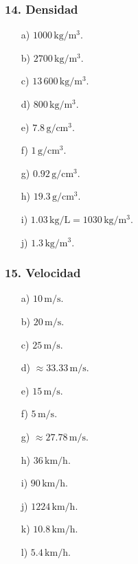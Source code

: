 \subsubsection*{14. Densidad}
\begin{enumerate}
    \item[a)] $1000\,\mathrm{kg/m^3}$.
    \item[b)] $2700\,\mathrm{kg/m^3}$.
    \item[c)] $13\,600\,\mathrm{kg/m^3}$.
    \item[d)] $800\,\mathrm{kg/m^3}$.
    \item[e)] $7.8\,\mathrm{g/cm^3}$.
    \item[f)] $1\,\mathrm{g/cm^3}$.
    \item[g)] $0.92\,\mathrm{g/cm^3}$.
    \item[h)] $19.3\,\mathrm{g/cm^3}$.
    \item[i)] $1.03\,\mathrm{kg/L}=1030\,\mathrm{kg/m^3}$.
    \item[j)] $1.3\,\mathrm{kg/m^3}$.
\end{enumerate}

\subsubsection*{15. Velocidad}
\begin{enumerate}
    \item[a)] $10\,\mathrm{m/s}$.
    \item[b)] $20\,\mathrm{m/s}$.
    \item[c)] $25\,\mathrm{m/s}$.
    \item[d)] $\approx33.33\,\mathrm{m/s}$.
    \item[e)] $15\,\mathrm{m/s}$.
    \item[f)] $5\,\mathrm{m/s}$.
    \item[g)] $\approx27.78\,\mathrm{m/s}$.
    \item[h)] $36\,\mathrm{km/h}$.
    \item[i)] $90\,\mathrm{km/h}$.
    \item[j)] $1224\,\mathrm{km/h}$.
    \item[k)] $10.8\,\mathrm{km/h}$.
    \item[l)] $5.4\,\mathrm{km/h}$.
\end{enumerate}

